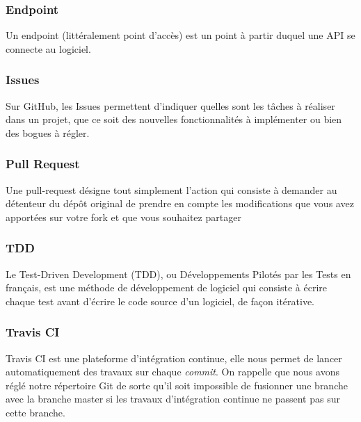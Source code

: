 \documentclass[11pt, a4paper]{report}
\begin{document}
      \subsubsection{Endpoint}
        Un endpoint (littéralement point d'accès) est un point à partir duquel une API se connecte au logiciel.
        
      \subsubsection{Issues}
        Sur GitHub, les Issues permettent d'indiquer quelles sont les tâches à réaliser dans un projet, que ce soit des nouvelles fonctionnalités à implémenter ou bien des bogues à régler.
        
      \subsubsection{Pull Request}
        Une pull-request désigne tout simplement l'action qui consiste à demander au détenteur du dépôt original de prendre en compte les modifications que vous avez apportées sur votre fork et que vous souhaitez partager
        
      \subsubsection{TDD}
        Le Test-Driven Development (TDD), ou Développements Pilotés par les Tests en français, est une méthode de développement de logiciel qui consiste à écrire chaque test avant d'écrire le code source d'un logiciel, de façon itérative.
        
      \subsubsection{Travis CI}
        Travis CI est une plateforme d'intégration continue, elle nous permet de lancer automatiquement des travaux sur chaque \textit{commit}. On rappelle que nous avons réglé notre répertoire Git de sorte qu'il soit impossible de fusionner une branche avec la branche master si les travaux d'intégration continue ne passent pas sur cette branche.
\end{document}
